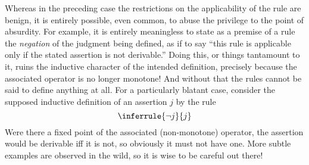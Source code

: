 \documentclass[11pt,twoside]{article}
\begin{document}
Whereas in the preceding case the restrictions on the applicability of the rule are
benign, it is entirely possible, even common, to abuse the privilege to the point of
absurdity.  For example, it is entirely meaningless to state as a premise of a rule the
\emph{negation} of the judgment being defined, as if to say ``this rule is applicable only
if the stated assertion is not derivable.''  Doing this, or things tantamount to it, ruins
the inductive character of the intended definition, precisely because the associated
operator is no longer monotone!  And without that the rules cannot be said to define
anything at all.  For a particularly blatant case, consider the supposed inductive
definition of an assertion $j$ by the rule
\begin{displaymath}
  \inferrule
  {\neg j}
  {j}
\end{displaymath}
Were there a fixed point of the associated (non-monotone) operator, the assertion would be
derivable iff it is not, so obviously it must not have one.  More subtle examples are
observed in the wild, so it is wise to be careful out there!



\end{document}
